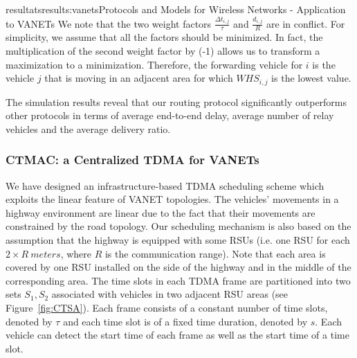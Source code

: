 \documentclass{ra2016}
\begin{document}
\begin{module}{resultats}{results:vanets}{Protocols and Models for Wireless Networks - Application to VANETs}
We note that the two weight factors $\frac{\Delta t_{i,j}}{\tau}$ and $\frac{d_{i,j}}{R}$ are in conflict. For simplicity, we assume 
that all the factors should be minimized. In fact, the multiplication of the second weight factor
by (-1) allows us to transform a maximization to a minimization. Therefore, the forwarding vehicle for $i$ is the 
vehicle $j$ that is moving in an adjacent area for which $WHS_{i,j}$ is the lowest value.

The simulation results reveal that our routing protocol significantly outperforms other
protocols in terms of average end-to-end delay, average number
of relay vehicles and the average delivery ratio.

\subsubsection{CTMAC: a Centralized TDMA for VANETs}

\begin{participants}
\end{participants}
    
We have designed an infrastructure-based TDMA scheduling scheme which exploits the linear feature of VANET topologies. The 
vehicles' movements in a highway environment are linear due to the fact that their movements are constrained by the road topology. Our 
scheduling mechanism is also based on the assumption that the highway is equipped with some RSUs (i.e. one RSU 
for each $2\times R~meters$, where $R$ is the communication range). Note that each area is covered by one RSU installed on 
the side of the highway and in the middle of the corresponding area. The time slots in each TDMA 
frame are partitioned into two sets $S_1, S_2$ associated with vehicles in two adjacent RSU 
areas (see Figure~\ref{fig:CTSA}). Each frame consists of a constant number of time slots, denoted by $\tau$ and each time 
slot is of a fixed time duration, denoted by $s$. Each vehicle can detect the start time of each frame as well as the 
start time of a time slot. 


\end{module}
\end{document}
